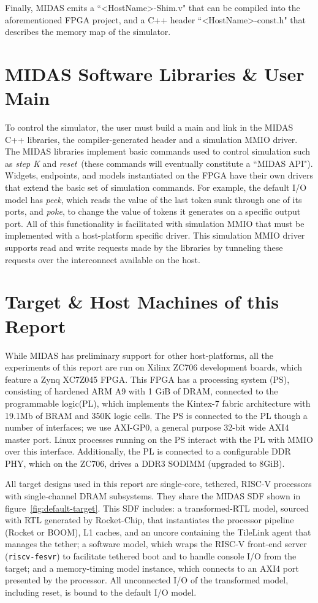 Finally, MIDAS emits a ``<HostName>-Shim.v" that can be compiled into the aforementioned
FPGA project, and a C++ header ``<HostName>-const.h" that describes the memory map of the simulator.

\section{MIDAS Software Libraries \& User Main}

To control the simulator, the user must build a main and link in the MIDAS C++
libraries, the compiler-generated header and a simulation MMIO driver.  The
MIDAS libraries implement basic commands used to control simulation such as
\emph{step K} and \emph{reset}~(these commands will eventually constitute a
``MIDAS API"). Widgets, endpoints, and models instantiated on the FPGA have
their own drivers that extend the basic set of simulation commands. For
example, the default I/O model has \emph{peek}, which reads the value of the
last token sunk through one of its ports, and \emph{poke}, to change the value
of tokens it generates on a specific output port.  All of this functionality is
facilitated with simulation MMIO that must be implemented with a host-platform
specific driver. This simulation MMIO driver supports read and write requests
made by the libraries by tunneling these requests over the interconnect available
on the host.

\section{Target \& Host Machines of this Report}\label{sec:targetandhostmachines}

While MIDAS has preliminary support for other host-platforms, all the
experiments of this report are run on Xilinx ZC706 development boards, which
feature a Zynq XC7Z045 FPGA. This FPGA has a processing system (PS),
consisting of hardened ARM A9 with 1 GiB of DRAM, connected to the
programmable logic(PL), which implements the Kintex-7 fabric architecture with
19.1Mb of BRAM and 350K logic cells. The PS is connected to the PL though a
number of interfaces; we use AXI-GP0, a general purpose 32-bit wide AXI4 master port.
Linux processes running on the PS interact with the PL with MMIO over this
interface. Additionally, the PL is connected to a configurable DDR PHY, which on the
ZC706, drives a DDR3 SODIMM (upgraded to 8GiB).

All target designs used in this report are single-core, tethered, RISC-V
processors with single-channel DRAM subsystems.  They share the MIDAS SDF
shown in figure~\ref{fig:default-target}. This SDF includes: a transformed-RTL
model, sourced with RTL generated by Rocket-Chip, that instantiates the
processor pipeline (Rocket or BOOM), L1 caches, and an uncore containing the
TileLink agent that manages the tether; a software model, which wraps the
RISC-V front-end server (\texttt{riscv-fesvr}) to facilitate tethered boot
and to handle console I/O from the target; and a memory-timing
model instance, which connects to an AXI4 port presented by the processor.
All unconnected I/O of the transformed model, including reset, is bound to the
default I/O model.

